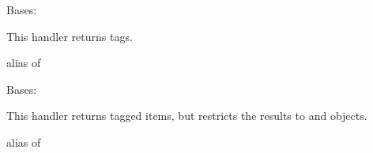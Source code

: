 \documentclass[letterpaper,10pt,english]{sphinxmanual}
\begin{document}

\begin{fulllineitems}
\label{generated/apps.profiles.handlers:apps.profiles.handlers.TagHandler}
Bases: 

This handler returns tags.


\begin{fulllineitems}
\label{generated/apps.profiles.handlers:apps.profiles.handlers.TagHandler.model}
alias of 

\end{fulllineitems}


\end{fulllineitems}



\begin{fulllineitems}
\label{generated/apps.profiles.handlers:apps.profiles.handlers.TaggedPersonHandler}
Bases: 

This handler returns tagged items, but restricts the results to  and  objects.


\begin{fulllineitems}
\label{generated/apps.profiles.handlers:apps.profiles.handlers.TaggedPersonHandler.model}
alias of 

\end{fulllineitems}



\begin{fulllineitems}
\label{generated/apps.profiles.handlers:apps.profiles.handlers.TaggedPersonHandler.queryset}
\end{fulllineitems}


\end{fulllineitems}
\end{document}
